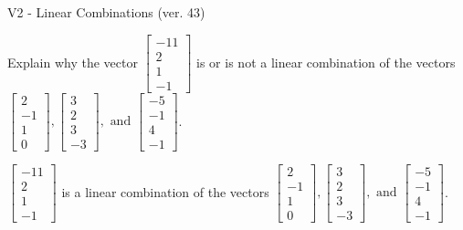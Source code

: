 \begin{exercise}
  \begin{exerciseTitle}V2 - Linear Combinations (ver. 43)\end{exerciseTitle}
  \begin{exerciseStatement}
    Explain why the vector \(\left[\begin{array}{c}
-11 \\
2 \\
1 \\
-1
\end{array}\right]\)  is or is not a linear 
	combination of the vectors \(\left[\begin{array}{c}
2 \\
-1 \\
1 \\
0
\end{array}\right] , \left[\begin{array}{c}
3 \\
2 \\
3 \\
-3
\end{array}\right] , \text{ and } \left[\begin{array}{c}
-5 \\
-1 \\
4 \\
-1
\end{array}\right]\).
	


  \end{exerciseStatement}
  \begin{exerciseAnswer}
   \(\left[\begin{array}{c}
-11 \\
2 \\
1 \\
-1
\end{array}\right]\) 
  	 is  
	a linear combination of the vectors \(\left[\begin{array}{c}
2 \\
-1 \\
1 \\
0
\end{array}\right] , \left[\begin{array}{c}
3 \\
2 \\
3 \\
-3
\end{array}\right] , \text{ and } \left[\begin{array}{c}
-5 \\
-1 \\
4 \\
-1
\end{array}\right]\).

	
  


  \end{exerciseAnswer}
\end{exercise}